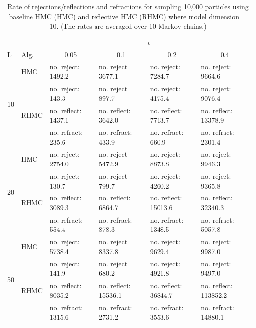 \documentclass{article} %
\begin{document}
\begin {table}
\caption {Rate of rejections/reflections and refractions for sampling 10,000 particles using baseline HMC (HMC) and reflective HMC (RHMC) where model dimension = 10.
(The rates are averaged over 10 Markov chains.)   } \label{tab2} 
\center
\begin{tabular}{llllll} 
\hline 
 & &\multicolumn{4}{c}{$\epsilon$} \\ 
\cline{3-6} L & Alg.& \multicolumn{1}{c}{0.05} & \multicolumn{1}{c}{0.1} & \multicolumn{1}{c}{0.2} & \multicolumn{1}{c}{0.4}\\ 
\hline 
%
\multirow{4}{*}{10}& HMC &  no. reject: 1492.2& no. reject: 3677.1 & no. reject: 7284.7& no. reject: 9664.6\vspace{3pt}\\
%
& \multirow{3}{*}{RHMC}& no. reject: 143.3& no. reject: 897.7& no. reject: 4175.4& no. reject: 9076.4\\ 
& &        no. reflect: 1437.1& no. reflect: 3642.0& no. reflect: 7713.7& no. reflect: 13378.9\\ 
& &          no. refract: 235.6& no. refract: 433.9& no. refract: 660.9& no. refract: 2301.4\vspace{12pt}\\ 
\multirow{4}{*}{20}& HMC &  no. reject: 2754.0& no. reject: 5472.9 & no. reject: 8873.8& no. reject: 9946.3\vspace{3pt}\\
%
& \multirow{3}{*}{RHMC}& no. reject: 130.7& no. reject: 799.7& no. reject: 4260.2& no. reject: 9365.8\\ 
& &        no. reflect: 3089.3& no. reflect: 6864.7& no. reflect: 15013.6& no. reflect: 32340.3\\ 
& &          no. refract: 554.4& no. refract: 878.3& no. refract: 1348.5& no. refract: 5057.8\vspace{12pt}\\ 
\multirow{4}{*}{50}& HMC &  no. reject: 5738.4& no. reject: 8337.8 & no. reject: 9629.4& no. reject: 9987.0\vspace{3pt}\\
%
& \multirow{3}{*}{RHMC}& no. reject: 141.9& no. reject: 680.2& no. reject: 4921.8& no. reject: 9497.0\\ 
& &        no. reflect: 8035.2& no. reflect: 15536.1& no. reflect: 36844.7& no. reflect: 113852.2\\ 
& &          no. refract: 1315.6& no. refract: 2731.2& no. refract: 3553.6& no. refract: 14880.1\vspace{12pt}\\ 

\end{tabular}
\end{table}
\end{document}
